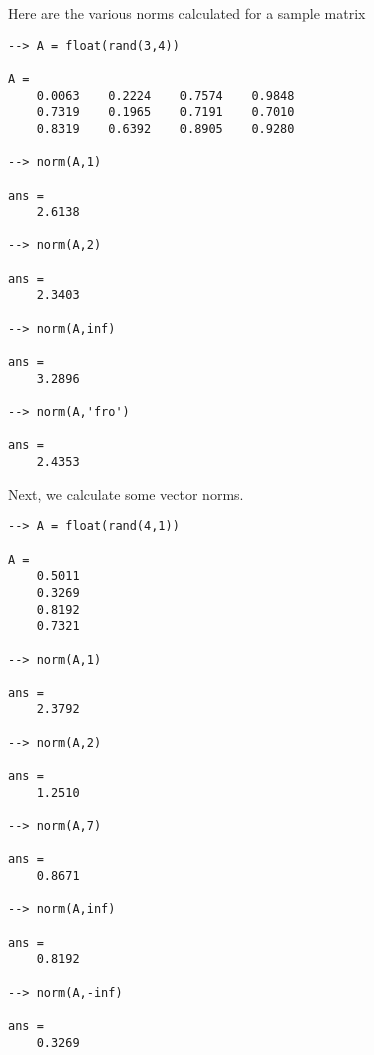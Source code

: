 Here are the various norms calculated for a sample matrix
\begin{verbatim}
--> A = float(rand(3,4))

A = 
    0.0063    0.2224    0.7574    0.9848 
    0.7319    0.1965    0.7191    0.7010 
    0.8319    0.6392    0.8905    0.9280 

--> norm(A,1)

ans = 
    2.6138 

--> norm(A,2)

ans = 
    2.3403 

--> norm(A,inf)

ans = 
    3.2896 

--> norm(A,'fro')

ans = 
    2.4353 
\end{verbatim}
Next, we calculate some vector norms.
\begin{verbatim}
--> A = float(rand(4,1))

A = 
    0.5011 
    0.3269 
    0.8192 
    0.7321 

--> norm(A,1)

ans = 
    2.3792 

--> norm(A,2)

ans = 
    1.2510 

--> norm(A,7)

ans = 
    0.8671 

--> norm(A,inf)

ans = 
    0.8192 

--> norm(A,-inf)

ans = 
    0.3269 
\end{verbatim}
